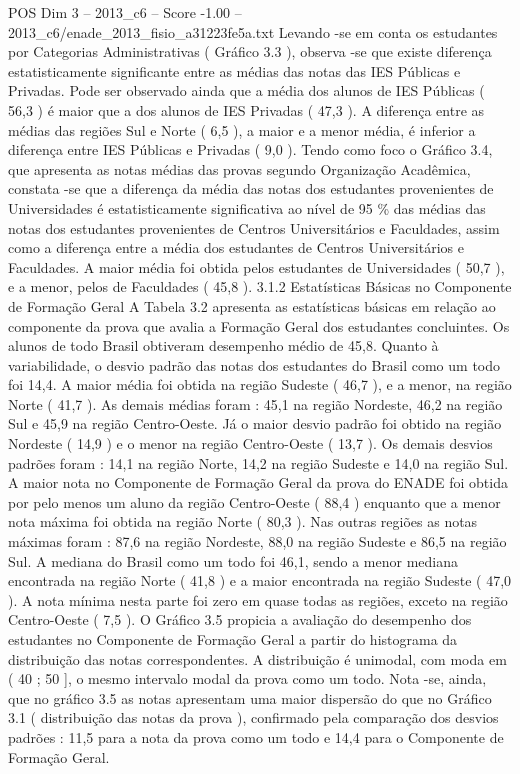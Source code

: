 \begin{textsample}{POS Dim 3 – 2013\_c6 – Score -1.00 – 2013\_c6/enade\_2013\_fisio\_a31223fe5a.txt}
Levando -se em conta os estudantes por Categorias Administrativas ( Gráfico 3.3 ), observa -se que existe diferença estatisticamente significante entre as médias das notas das IES Públicas e Privadas.
Pode ser observado ainda que a média dos alunos de IES Públicas ( 56,3 ) é maior que a dos alunos de IES Privadas ( 47,3 ).
A diferença entre as médias das regiões Sul e Norte ( 6,5 ), a maior e a menor média, é inferior a diferença entre IES Públicas e Privadas ( 9,0 ).
Tendo como foco o Gráfico 3.4, que apresenta as notas médias das provas segundo Organização Acadêmica, constata -se que a diferença da média das notas dos estudantes provenientes de Universidades é estatisticamente significativa ao nível de 95 \% das médias das notas dos estudantes provenientes de Centros Universitários e Faculdades, assim como a diferença entre a média dos estudantes de Centros Universitários e Faculdades.
A maior média foi obtida pelos estudantes de Universidades ( 50,7 ), e a menor, pelos de Faculdades ( 45,8 ). 3.1.2 Estatísticas Básicas no Componente de Formação Geral A Tabela 3.2 apresenta as estatísticas básicas em relação ao componente da prova que avalia a Formação Geral dos estudantes concluintes.
Os alunos de todo Brasil obtiveram desempenho médio de 45,8.
Quanto à variabilidade, o desvio padrão das notas dos estudantes do Brasil como um todo foi 14,4.
A maior média foi obtida na região Sudeste ( 46,7 ), e a menor, na região Norte ( 41,7 ).
As demais médias foram : 45,1 na região Nordeste, 46,2 na região Sul e 45,9 na região Centro-Oeste.
Já o maior desvio padrão foi obtido na região Nordeste ( 14,9 ) e o menor na região Centro-Oeste ( 13,7 ).
Os demais desvios padrões foram : 14,1 na região Norte, 14,2 na região Sudeste e 14,0 na região Sul.
A maior nota no Componente de Formação Geral da prova do ENADE foi obtida por pelo menos um aluno da região Centro-Oeste ( 88,4 ) enquanto que a menor nota máxima foi obtida na região Norte ( 80,3 ).
Nas outras regiões as notas máximas foram : 87,6 na região Nordeste, 88,0 na região Sudeste e 86,5 na região Sul.
A mediana do Brasil como um todo foi 46,1, sendo a menor mediana encontrada na região Norte ( 41,8 ) e a maior encontrada na região Sudeste ( 47,0 ).
A nota mínima nesta parte foi zero em quase todas as regiões, exceto na região Centro-Oeste ( 7,5 ).
O Gráfico 3.5 propicia a avaliação do desempenho dos estudantes no Componente de Formação Geral a partir do histograma da distribuição das notas correspondentes.
A distribuição é unimodal, com moda em ( 40 ; 50 ], o mesmo intervalo modal da prova como um todo.
Nota -se, ainda, que no gráfico 3.5 as notas apresentam uma maior dispersão do que no Gráfico 3.1 ( distribuição das notas da prova ), confirmado pela comparação dos desvios padrões : 11,5 para a nota da prova como um todo e 14,4 para o Componente de Formação Geral.

\end{textsample}
